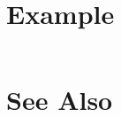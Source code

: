 


\section{Example} %
\label{sec:rbaCircularConv_example}
\begin{lstlisting}

\end{lstlisting}

\section{See Also} %
\label{sec:rbaCircularConv_see_also}
\texttt{}




